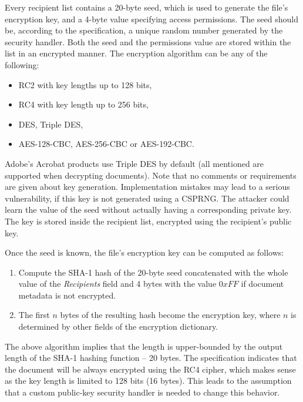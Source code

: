 \documentclass[11pt,oneside]{fithesis2}
\begin{document}
Every recipient list contains a 20-byte seed, which is used to generate the file's encryption key, and a 4-byte value specifying access permissions. The seed should be, according to the specification, a unique random number generated by the security handler. Both the seed and the permissions value are stored within the list in an encrypted manner. The encryption algorithm can be any of the following: 


\begin{itemize}
\setlength\itemsep{0.1em}
	\item{RC2 with key lengths up to 128 bits,}
	\item{RC4 with key length up to 256 bits,}
	\item{DES, Triple DES,}
	\item{AES-128-CBC, AES-256-CBC or AES-192-CBC.}
\end{itemize}

Adobe's Acrobat products use Triple DES by default (all mentioned are supported when decrypting documents). Note that no comments or requirements are given about key generation. Implementation mistakes may lead to a serious vulnerability, if this key is not generated using a CSPRNG. The attacker could learn the value of the seed without actually having a corresponding private key. The key is stored inside the recipient list, encrypted using the recipient's public key. 

Once the seed is known, the file's encryption key can be computed as follows:

\begin{enumerate}
\setlength\itemsep{0.1em}
	\item{Compute the SHA-1 hash of the 20-byte seed concatenated with the whole value of the \textit{Recipients} field and 4 bytes with the value $0xFF$ if document metadata is not encrypted.}
	\item{The first $n$ bytes of the resulting hash become the encryption key, where $n$ is determined by other fields of the encryption dictionary.}
\end{enumerate}

The above algorithm implies that the length is upper-bounded by the output length of the SHA-1 hashing function -- 20 bytes. The specification indicates that the document will be always encrypted using the RC4 cipher, which makes sense as the key length is limited to 128 bits (16 bytes). This leads to the assumption that a custom public-key security handler is needed to change this behavior.   
\end{document}
